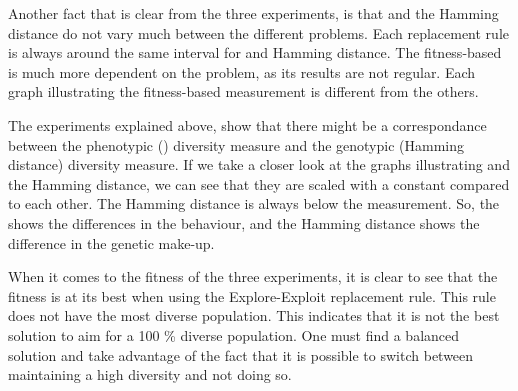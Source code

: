 Another fact that is clear from the three experiments, is that \dia{} and the Hamming distance do not vary much between the different problems. Each replacement rule is always around the same interval for \dia{} and Hamming distance. The fitness-based is much more dependent on the problem, as its results are not regular. Each graph illustrating the fitness-based measurement is different from the others.

The experiments explained above, show that there might be a correspondance between the phenotypic (\dia{}) diversity measure and the genotypic (Hamming distance) diversity measure. If we take a closer look at the graphs illustrating \dia{} and the Hamming distance, we can see that they are scaled with a constant compared to each other. The Hamming distance is always below the \dia{} measurement. So, the \dia{} shows the differences in the behaviour, and the Hamming distance shows the difference in the genetic make-up.  

When it comes to the fitness of the three experiments, it is clear to see that the fitness is at its best when using the Explore-Exploit replacement rule. This rule does not have the most diverse population. This indicates that it is not the best solution to aim for a 100 \% diverse population. One must find a balanced solution and take advantage of the fact that it is possible to switch between maintaining a high diversity and not doing so.




